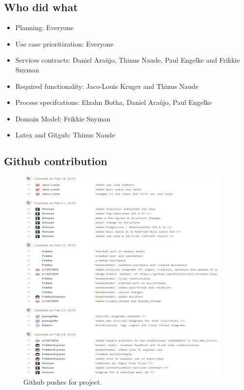 \documentclass [a4paper,12pt] {article}
\begin{document}
	\subsection*{Who did what}
		\begin{itemize}
			\item Planning: Everyone
			\item Use case prioritization: Everyone
			\item Services contracts: Daniel Araüjo, Thinus Naude, Paul Engelke and Frikkie Snyman
			\item Required functionality: Jaco-Louis Kruger and Thinus Naude
			\item Process specifcations: Elzahn Botha, Daniel Araüjo, Paul Engelke
			\item Domain Model: Frikkie Snyman
			\item Latex and Gitgub: Thinus Naude
		\end{itemize}
	\pagebreak
	\subsection*{Github contribution}
	\begin{figure}[h!]
		\centering
		\includegraphics[width=0.95\textwidth]{githubCommits.png}
		\caption{Github pushes for project.}
	\end{figure}
\pagebreak
\end{document}
